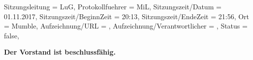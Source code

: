\begin{Protokoll}{
        Sitzungsleitung                 = {LuG},             %
        Protokollfuehrer                = {MiL},              %
        Sitzungszeit/Datum              = {01.11.2017},       %
        Sitzungszeit/BeginnZeit         = {20:13},            %
        Sitzungszeit/EndeZeit           = {21:56},            %
        Ort                             = {Mumble},            %
        Aufzeichnung/URL                = {},                %
        Aufzeichnung/Verantwortlicher   = {},                  %
        Status                          = {false},            %
    }
    
    \begin{Anwesenheitsliste}
    \end{Anwesenheitsliste}
    
    \textbf{Der Vorstand ist beschlussfähig.}
    
    

\end{Protokoll}
